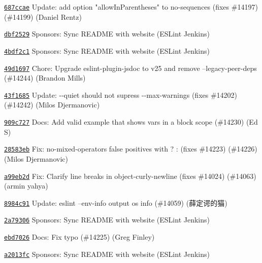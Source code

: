 \begin{DoxyItemize}
\item \href{https://github.com/eslint/eslint/commit/687ccae517b8b815cf21e948f80d22e2bf118a99}{\texttt{ {\ttfamily 687ccae}}} Update\+: add option "{}allow\+In\+Parentheses"{} to no-\/sequences (fixes \#14197) (\#14199) (Daniel Rentz)
\item \href{https://github.com/eslint/eslint/commit/dbf252964d9a2b8957cfe0aed5c87a6d4a5cce24}{\texttt{ {\ttfamily dbf2529}}} Sponsors\+: Sync README with website (ESLint Jenkins)
\item \href{https://github.com/eslint/eslint/commit/4bdf2c1dade27625b601080687ce95b8c229e491}{\texttt{ {\ttfamily 4bdf2c1}}} Sponsors\+: Sync README with website (ESLint Jenkins)
\item \href{https://github.com/eslint/eslint/commit/49d16977d969070e5240074e76036f56631a90d3}{\texttt{ {\ttfamily 49d1697}}} Chore\+: Upgrade eslint-\/plugin-\/jsdoc to v25 and remove --legacy-\/peer-\/deps (\#14244) (Brandon Mills)
\item \href{https://github.com/eslint/eslint/commit/43f1685356b9840e09631843ad9ccf0440a498b0}{\texttt{ {\ttfamily 43f1685}}} Update\+: {\ttfamily -\/-\/quiet} should not supress {\ttfamily -\/-\/max-\/warnings} (fixes \#14202) (\#14242) (Milos Djermanovic)
\item \href{https://github.com/eslint/eslint/commit/909c7271b8d294bd884827ad5df02615b6ec5e82}{\texttt{ {\ttfamily 909c727}}} Docs\+: Add valid example that shows vars in a block scope (\#14230) (Ed S)
\item \href{https://github.com/eslint/eslint/commit/28583eb8ada20f32579841bec3fbd60a018d5931}{\texttt{ {\ttfamily 28583eb}}} Fix\+: no-\/mixed-\/operators false positives with {\ttfamily ? \+:} (fixes \#14223) (\#14226) (Milos Djermanovic)
\item \href{https://github.com/eslint/eslint/commit/a99eb2dc2a297d16e40a9feef3956668716c4eb5}{\texttt{ {\ttfamily a99eb2d}}} Fix\+: Clarify line breaks in object-\/curly-\/newline (fixes \#14024) (\#14063) (armin yahya)
\item \href{https://github.com/eslint/eslint/commit/8984c91372e64d1e8dd2ce21b87b80977d57bff9}{\texttt{ {\ttfamily 8984c91}}} Update\+: eslint --env-\/info output os info (\#14059) (薛定谔的猫)
\item \href{https://github.com/eslint/eslint/commit/2a79306f71c4c80f1e3e73be2a140d07cf55c63d}{\texttt{ {\ttfamily 2a79306}}} Sponsors\+: Sync README with website (ESLint Jenkins)
\item \href{https://github.com/eslint/eslint/commit/ebd70263f6e6fe597613d90f4b8de84710c2f3d6}{\texttt{ {\ttfamily ebd7026}}} Docs\+: Fix typo (\#14225) (Greg Finley)
\item \href{https://github.com/eslint/eslint/commit/a2013fcf996c8651bc760df21d900442828a6884}{\texttt{ {\ttfamily a2013fc}}} Sponsors\+: Sync README with website (ESLint Jenkins)
\end{DoxyItemize}

